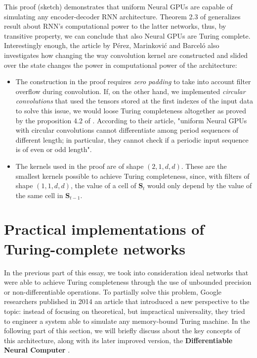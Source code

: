 \documentclass{article}
\begin{document}
This proof (sketch) demonstrates that uniform Neural GPUs are capable of simulating any encoder-decoder RNN architecture. Theorem 2.3 of \cite{PER19} generalizes \cite{SIE95} result about RNN's computational power to the latter networks, thus, by transitive property, we can conclude that also Neural GPUs are Turing complete. Interestingly enough, the article by Pérez, Marinković and Barceló also investigates how changing the way convolution kernel are constructed and slided over the state changes the power in computational power of the architecture:

\begin{itemize}
    \item The construction in the proof requires \textit{zero padding} to take into account filter overflow during convolution. If, on the other hand, we implemented \textit{circular convolutions} that used the tensors stored at the first indexes of the input data to solve this issue, we would loose Turing completeness altogether as proved by the proposition 4.2 of \cite{PER19}. According to their article, "uniform Neural GPUs with circular convolutions cannot differentiate among period sequences of different length; in particular, they cannot check if a periodic input sequence is of even or odd length".
    \item The kernels used in the proof are of shape $(2,1,d,d)$. These are the smallest kernels possible to achieve Turing completeness, since, with filters of shape $(1,1,d,d)$, the value of a cell of $\mathbf{S}_t$ would only depend by the value of the same cell in $\mathbf{S}_{t-1}$.
\end{itemize}

\section{Practical implementations of Turing-complete networks}

In the previous part of this essay, we took into consideration ideal networks that were able to achieve Turing completeness through the use of unbounded precision or non-differentiable operations. To partially solve this problem, Google researchers published in 2014 an article \cite{GRA14} that introduced a new perspective to the topic: instead of focusing on theoretical, but impractical universality, they tried to engineer a system able to simulate any memory-bound Turing machine. In the following part of this section, we will briefly discuss about the key concepts of this architecture, along with its later improved version, the \textbf{Differentiable Neural Computer} \cite{GRA16}.
\end{document}
